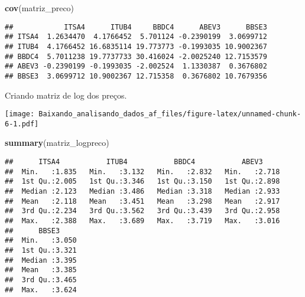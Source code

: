 \documentclass[]{article}
\newenvironment{Shaded}{\begin{snugshade}}{\end{snugshade}}
\newcommand{\KeywordTok}[1]{\textcolor[rgb]{0.13,0.29,0.53}{\textbf{{#1}}}}
\newcommand{\DataTypeTok}[1]{\textcolor[rgb]{0.13,0.29,0.53}{{#1}}}
\newcommand{\StringTok}[1]{\textcolor[rgb]{0.31,0.60,0.02}{{#1}}}
\newcommand{\NormalTok}[1]{{#1}}
\begin{document}
\begin{Shaded}
\begin{Highlighting}[]
\KeywordTok{cov}\NormalTok{(matriz_preco)}
\end{Highlighting}
\end{Shaded}

\begin{verbatim}
##            ITSA4      ITUB4     BBDC4      ABEV3      BBSE3
## ITSA4  1.2634470  4.1766452  5.701124 -0.2390199  3.0699712
## ITUB4  4.1766452 16.6835114 19.773773 -0.1993035 10.9002367
## BBDC4  5.7011238 19.7737733 30.416024 -2.0025240 12.7153579
## ABEV3 -0.2390199 -0.1993035 -2.002524  1.1330387  0.3676802
## BBSE3  3.0699712 10.9002367 12.715358  0.3676802 10.7679356
\end{verbatim}

Criando matriz de log dos preços.

\begin{Shaded}
\end{Shaded}

\texttt{[image: Baixando\_analisando\_dados\_af\_files/figure-latex/unnamed-chunk-6-1.pdf]}

\begin{Shaded}
\begin{Highlighting}[]
\KeywordTok{summary}\NormalTok{(matriz_logpreco)}
\end{Highlighting}
\end{Shaded}

\begin{verbatim}
##      ITSA4           ITUB4           BBDC4           ABEV3      
##  Min.   :1.835   Min.   :3.132   Min.   :2.832   Min.   :2.718  
##  1st Qu.:2.005   1st Qu.:3.346   1st Qu.:3.150   1st Qu.:2.898  
##  Median :2.123   Median :3.486   Median :3.318   Median :2.933  
##  Mean   :2.118   Mean   :3.451   Mean   :3.298   Mean   :2.917  
##  3rd Qu.:2.234   3rd Qu.:3.562   3rd Qu.:3.439   3rd Qu.:2.958  
##  Max.   :2.388   Max.   :3.689   Max.   :3.719   Max.   :3.016  
##      BBSE3      
##  Min.   :3.050  
##  1st Qu.:3.321  
##  Median :3.395  
##  Mean   :3.385  
##  3rd Qu.:3.465  
##  Max.   :3.624
\end{verbatim}
\end{document}
